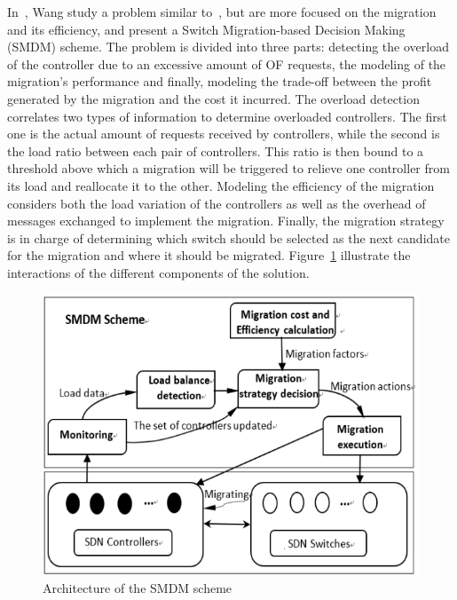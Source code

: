 In~\cite{Wang2017d}, Wang \etal study a problem similar to~\cite{Ye2017a}, but are more focused on the migration and its efficiency, and present a Switch Migration-based Decision Making (SMDM) scheme. The problem is divided into three parts: detecting the overload of the controller due to an excessive amount of OF requests, the modeling of the migration's performance and finally, modeling the trade-off between the profit generated by the migration and the cost it incurred.
The overload detection correlates two types of information to determine overloaded controllers.
The first one is the actual amount of requests received by controllers, while the second is the load ratio between each pair of controllers.
This ratio is then bound to a threshold above which a migration will be triggered to relieve one controller from its load and reallocate it to the other.
Modeling the efficiency of the migration considers both the load variation of the controllers as well as the overhead of messages exchanged to implement the migration.  
Finally, the migration strategy is in charge of determining which switch should be selected as the next candidate for the migration and where it should be migrated.
Figure~\ref{fig:smdm-wang2017d} illustrate the interactions of the different components of the solution.

\begin{figure}[ht]
    \centering
    \includegraphics[scale=0.65]{figures/wang2017d.png}
    \caption{Architecture of the SMDM scheme~\cite{Wang2017d}}
    \label{fig:smdm-wang2017d}
\end{figure}

